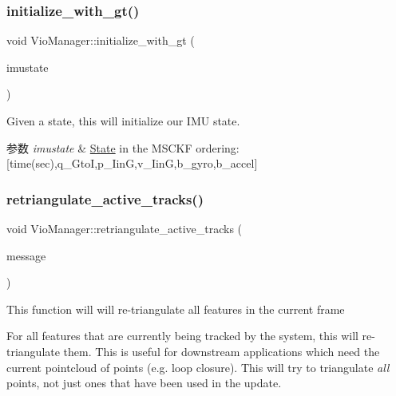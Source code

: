 \subsubsection{\texorpdfstring{initialize\+\_\+with\+\_\+gt()}{initialize\_with\_gt()}}
{\footnotesize\ttfamily void Vio\+Manager\+::initialize\+\_\+with\+\_\+gt (\begin{DoxyParamCaption}\item[{Eigen\+::\+Matrix$<$ double, 17, 1 $>$}]{imustate }\end{DoxyParamCaption})}



Given a state, this will initialize our I\+MU state. 


\begin{DoxyParams}{参数}
{\em imustate} & \hyperlink{classov__msckf_1_1State}{State} in the M\+S\+C\+KF ordering\+: \mbox{[}time(sec),q\+\_\+\+GtoI,p\+\_\+\+IinG,v\+\_\+\+IinG,b\+\_\+gyro,b\+\_\+accel\mbox{]} \\
\hline
\end{DoxyParams}
\mbox{\label{classov__msckf_1_1VioManager_ac3259add6e59f191388dfe989d668759}} 
\subsubsection{\texorpdfstring{retriangulate\+\_\+active\+\_\+tracks()}{retriangulate\_active\_tracks()}}
{\footnotesize\ttfamily void Vio\+Manager\+::retriangulate\+\_\+active\+\_\+tracks (\begin{DoxyParamCaption}\item[{const \hyperlink{structov__core_1_1CameraData}{ov\+\_\+core\+::\+Camera\+Data} \&}]{message }\end{DoxyParamCaption})\hspace{0.3cm}{\ttfamily [protected]}}



This function will will re-\/triangulate all features in the current frame 

For all features that are currently being tracked by the system, this will re-\/triangulate them. This is useful for downstream applications which need the current pointcloud of points (e.\+g. loop closure). This will try to triangulate {\itshape all} points, not just ones that have been used in the update.



